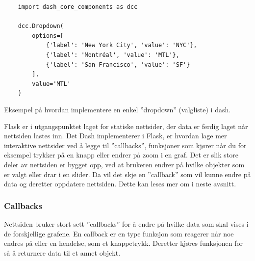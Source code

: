 \begin{listing}[!htb]
\begin{verbatim}
    import dash_core_components as dcc

    dcc.Dropdown(
        options=[
            {'label': 'New York City', 'value': 'NYC'},
            {'label': 'Montréal', 'value': 'MTL'},
            {'label': 'San Francisco', 'value': 'SF'}
        ],
        value='MTL'
    )
\end{verbatim}
\caption{Eksempel på hvordan implementere en enkel ''dropdown'' (valgliste) i dash.}
\label{code:impl:nettside:dash1}
\end{listing}

Flask er i utgangspunktet laget for statiske nettsider, der data er ferdig laget når nettsiden lastes inn. 
Det Dash implementerer i Flask, er hvordan lage mer interaktive nettsider ved å legge til ''callbacks'', funksjoner som kjører når du for eksempel trykker på en knapp eller endrer på zoom i en graf.
Det er slik store deler av nettsiden er bygget opp, ved at brukeren endrer på hvilke objekter som er valgt eller drar i en slider. 
Da vil det skje en ''callback'' som vil kunne endre på data og deretter oppdatere nettsiden. 
Dette kan leses mer om i neste avsnitt.



\subsubsection{Callbacks}\label{sec:impl:nettside:callback}

Nettsiden bruker stort sett ''callbacks'' for å endre på hvilke data som skal vises i de forskjellige grafene. 
En callback er en type funksjon som reagerer når noe endres på eller en hendelse, som et knappetrykk. 
Deretter kjøres funksjonen for så å returnere data til et annet objekt. 

